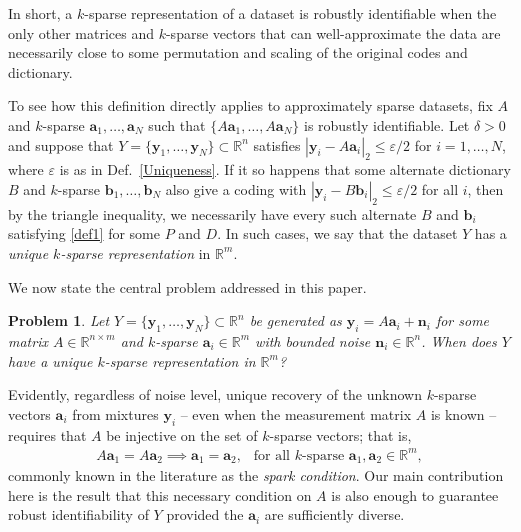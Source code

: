 \documentclass[journal, onecolumn]{IEEEtran}
\newtheorem{problem}{Problem}
\begin{document}
In short, a $k$-sparse representation of a dataset is robustly identifiable when the only other matrices and $k$-sparse vectors that can well-approximate the data are necessarily close to some permutation and scaling of the original codes and dictionary.  

To see how this definition directly applies to approximately sparse datasets, fix $A$ and $k$-sparse $\mathbf{a}_1, \ldots, \mathbf{a}_N$ such that $\{A\mathbf{a}_1, \ldots, A\mathbf{a}_N\}$ is robustly identifiable. Let $\delta > 0$ and suppose that $Y = \{\mathbf{y}_1, \ldots, \mathbf{y}_N\} \subset \mathbb{R}^n$ satisfies $|\mathbf{y}_i - A\mathbf{a}_i|_2 \leq \varepsilon/2$ for $i = 1, \ldots, N$, where $\varepsilon$ is as in Def.~\ref{Uniqueness}. %
If it so happens that some alternate dictionary $B$ and $k$-sparse $\mathbf{b}_1, \ldots, \mathbf{b}_N$ also give a coding with $|\mathbf{y}_i - B\mathbf{b}_i|_2 \leq \varepsilon/2$ for all $i$, then by the triangle inequality, we necessarily have every such alternate $B$ and $\mathbf{b}_i$ satisfying \eqref{def1} for some $P$ and $D$. 
In such cases, we say that the dataset $Y$ has a \textit{unique $k$-sparse representation} in $\mathbb{R}^m$. 

We now state the central problem addressed in this paper.

\begin{problem}\label{DUTproblem}
Let $Y = \{\mathbf{y}_1, \ldots, \mathbf{y}_N \} \subset \mathbb{R}^n$ be generated as $\mathbf{y}_i = A\mathbf{a}_i  + \mathbf{n}_i$ for some matrix $A \in \mathbb{R}^{n \times m}$ and $k$-sparse $\mathbf{a}_i \in \mathbb{R}^m$ with bounded noise $\mathbf{n}_i \in \mathbb{R}^n$. When does $Y$ have a unique $k$-sparse representation in $\mathbb{R}^m$?
\end{problem}

Evidently, regardless of noise level, unique recovery of the unknown $k$-sparse vectors $\mathbf{a}_i$ from mixtures $\mathbf{y}_i$ -- even when the measurement matrix $A$ is known -- requires that $A$ be injective on the set of $k$-sparse vectors; that is,
\begin{align}\label{SparkCondition}
A\mathbf{a}_1 = A\mathbf{a}_2 \implies \mathbf{a}_1 = \mathbf{a}_2, \ \ \text{ for all $k$-sparse } \mathbf{a}_1, \mathbf{a}_2 \in \mathbb{R}^m,
\end{align}
commonly known in the literature as the \emph{spark condition}. Our main contribution here is the result that this necessary condition on $A$ is also enough to guarantee robust identifiability of $Y$ provided the $\mathbf{a}_i$ are sufficiently diverse.  
\end{document}
